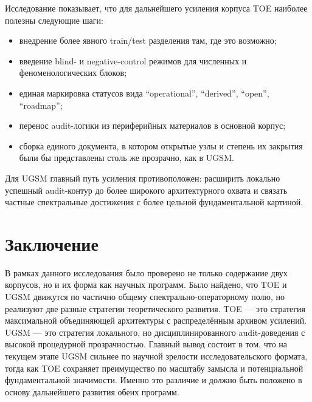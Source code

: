 \documentclass[12pt,a4paper]{article}
\begin{document}
Исследование показывает, что для дальнейшего усиления корпуса TOE наиболее полезны следующие шаги:
\begin{itemize}
    \item внедрение более явного train/test разделения там, где это возможно;
    \item введение blind- и negative-control режимов для численных и феноменологических блоков;
    \item единая маркировка статусов вида ``operational'', ``derived'', ``open'', ``roadmap'';
    \item перенос audit-логики из периферийных материалов в основной корпус;
    \item сборка единого документа, в котором открытые узлы и степень их закрытия были бы представлены столь же прозрачно, как в UGSM.
\end{itemize}

Для UGSM главный путь усиления противоположен: расширить локально успешный audit-контур до более широкого архитектурного охвата и связать частные спектральные достижения с более цельной фундаментальной картиной.

\section{Заключение}

В рамках данного исследования было проверено не только содержание двух корпусов, но и их форма как научных программ. Было найдено, что TOE и UGSM движутся по частично общему спектрально-операторному полю, но реализуют две разные стратегии теоретического развития. TOE --- это стратегия максимальной объединяющей архитектуры с распределённым архивом усилений. UGSM --- это стратегия локального, но дисциплинированного audit-доведения с высокой процедурной прозрачностью. Главный вывод состоит в том, что на текущем этапе UGSM сильнее по научной зрелости исследовательского формата, тогда как TOE сохраняет преимущество по масштабу замысла и потенциальной фундаментальной значимости. Именно это различие и должно быть положено в основу дальнейшего развития обеих программ.
\end{document}
